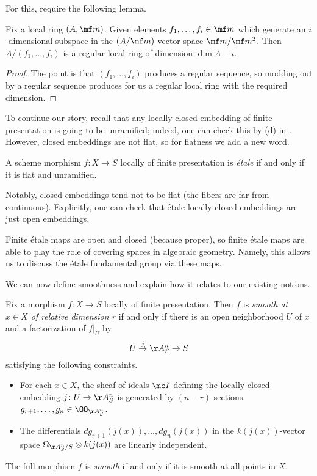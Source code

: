 \documentclass[../notes.tex]{subfiles}
\begin{document}
For this, require the following lemma.
\begin{lemma}
	Fix a local ring $(A,\mf m)$. Given elements $f_1,\ldots,f_i\in\mf m$ which generate an $i$-dimensional subspace in the $(A/\mf m)$-vector space $\mf m/\mf m^2$. Then $A/(f_1,\ldots,f_i)$ is a regular local ring of dimension $\dim A-i$.
\end{lemma}
\begin{proof}
	The point is that $(f_1,\ldots,f_i)$ produces a regular sequence, so modding out by a regular sequence produces for us a regular local ring with the required dimension.
\end{proof}
To continue our story, recall that any locally closed embedding of finite presentation is going to be unramified; indeed, one can check this by (d) in . However, closed embeddings are not flat, so for flatness we add a new word.
\begin{definition}[\'etale]
	A scheme morphism $f\colon X\to S$ locally of finite presentation is \textit{\'etale} if and only if it is flat and unramified.
\end{definition}
Notably, closed embeddings tend not to be flat (the fibers are far from continuous). Explicitly, one can check that \'etale locally closed embeddings are just open embeddings.
\begin{remark}
	Finite \'etale maps are open and closed (because proper), so finite \'etale maps are able to play the role of covering spaces in algebraic geometry. Namely, this allows us to discuss the \'etale fundamental group via these maps.
\end{remark}
We can now define smoothness and explain how it relates to our existing notions.
\begin{definition}[smooth]
	Fix a morphism $f\colon X\to S$ locally of finite presentation. Then $f$ is \textit{smooth at $x\in X$ of relative dimension $r$} if and only if there is an open neighborhood $U$ of $x$ and a factorization of $f|_U$ by
	\[U\stackrel j\to\AA^n_S\to S\]
	satisfying the following constraints.
	\begin{itemize}
		\item For each $x\in X$, the sheaf of ideals $\mc I$ defining the locally closed embedding $j\colon U\to\AA^n_S$ is generated by $(n-r)$ sections $g_{r+1},\ldots,g_n\in\OO_{\AA^n_S}$.
		\item The differentials $dg_{r+1}(j(x)),\ldots,dg_n(j(x))$ in the $k(j(x))$-vector space $\Omega_{\AA^n_S/S}\otimes k(j(x))$ are linearly independent.
	\end{itemize}
	The full morphism $f$ is \textit{smooth} if and only if it is smooth at all points in $X$.
\end{definition}
\end{document}
